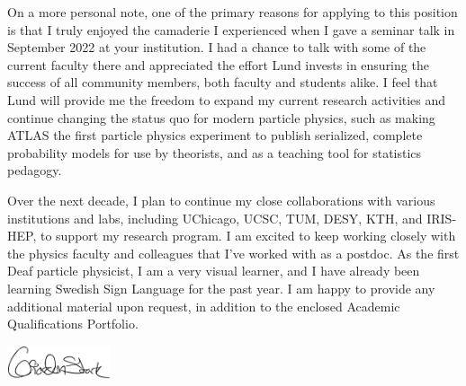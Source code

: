 On a more personal note, one of the primary reasons for applying to this position is that I truly enjoyed the camaderie I experienced when I gave a seminar talk in September 2022 at your institution. I had a chance to talk with some of the current faculty there and appreciated the effort Lund invests in ensuring the success of all community members, both faculty and students alike. I feel that Lund will provide me the freedom to expand my current research activities and continue changing the status quo for modern particle physics, such as making ATLAS the first particle physics experiment to publish serialized, complete probability models for use by theorists, and as a teaching tool for statistics pedagogy.

Over the next decade, I plan to continue my close collaborations with various institutions and labs, including UChicago, UCSC, TUM, DESY, KTH, and IRIS-HEP, to support my research program. I am excited to keep working closely with the physics faculty and colleagues that I've worked with as a postdoc. As the first Deaf particle physicist, I am a very visual learner, and I have already been learning Swedish Sign Language for the past year. I am happy to provide any additional material upon request, in addition to the enclosed Academic Qualifications Portfolio.

\includegraphics[height=1cm]{attachments/signature}
\vfill%

